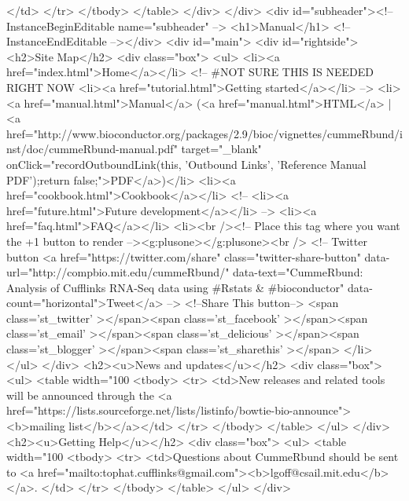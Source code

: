                 </td>
              </tr>
            </tbody>
          </table>
        </div>
      </div>
      <div id="subheader"><!-- InstanceBeginEditable name="subheader" -->
	  <h1>Manual</h1>
	  <!-- InstanceEndEditable --></div>
      <div id="main">
        <div id="rightside">
          <h2>Site Map</h2>
          <div class="box">
            <ul>
              <li><a href="index.html">Home</a></li>
              <!-- #NOT SURE THIS IS NEEDED RIGHT NOW <li><a href="tutorial.html">Getting started</a></li> -->
              <li><a href="manual.html">Manual</a> (<a href="manual.html">HTML</a> | <a href="http://www.bioconductor.org/packages/2.9/bioc/vignettes/cummeRbund/inst/doc/cummeRbund-manual.pdf" target="_blank"  onClick="recordOutboundLink(this, 'Outbound Links', 'Reference Manual PDF');return false;">PDF</a>)</li>
              <li><a href="cookbook.html">Cookbook</a></li>
              <!-- <li><a href="future.html">Future development</a></li> -->
              <li><a href="faq.html">FAQ</a></li>
              <li><br /><!-- Place this tag where you want the +1 button to render --><g:plusone></g:plusone><br />
              <!-- Twitter button
              <a href="https://twitter.com/share" class="twitter-share-button" data-url="http://compbio.mit.edu/cummeRbund/" data-text="CummeRbund: Analysis of Cufflinks RNA-Seq data using #Rstats & #bioconductor" data-count="horizontal">Tweet</a>
              -->
              <!--Share This button-->
              <span  class='st_twitter' ></span><span  class='st_facebook' ></span><span  class='st_email' ></span><span  class='st_delicious' ></span><span  class='st_blogger' ></span><span  class='st_sharethis' ></span>
              </li>
            </ul>
          </div>
          <h2><u>News and updates</u></h2>
          <div class="box">
            <ul>
              <table width="100%
                <tbody>
                  <tr>
                    <td>New releases and related tools will be announced
                      through the <a
                        href="https://lists.sourceforge.net/lists/listinfo/bowtie-bio-announce"><b>mailing
                          list</b></a></td>
                  </tr>
                </tbody>
              </table>
            </ul>
          </div>
          <h2><u>Getting Help</u></h2>
          <div class="box">
            <ul>
              <table width="100%
                <tbody>
                  <tr>
                    <td>Questions about CummeRbund should be sent to <a
                        href="mailto:tophat.cufflinks@gmail.com"><b>lgoff@csail.mit.edu</b></a>.                      </td>
                  </tr>
                </tbody>
              </table>
            </ul>
          </div>
       
